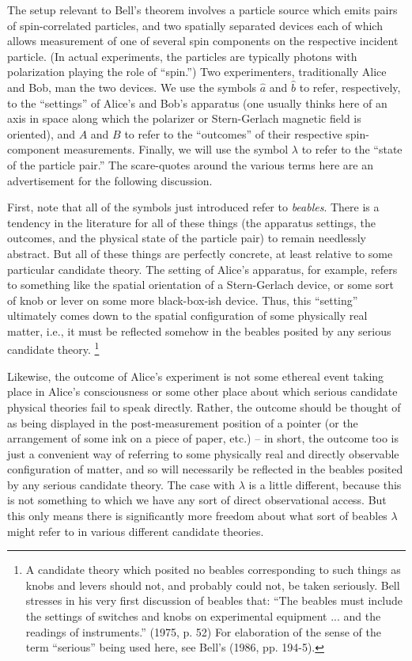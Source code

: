 \documentclass[aps,prc,twocolumn]{revtex4}
\begin{document}
The setup relevant to Bell's theorem involves a particle source which
emits pairs of spin-correlated particles, and two spatially separated
devices each of which allows measurement of one of several spin
components on the respective incident particle.  (In actual
experiments, the particles are typically photons with polarization
playing the role of ``spin.'')  Two experimenters, traditionally
Alice and Bob, man the two devices.  We use the symbols
$\hat{a}$ and $\hat{b}$ to refer, respectively, to the ``settings'' of
Alice's and Bob's apparatus (one usually thinks here of an axis in
space along which the polarizer or Stern-Gerlach magnetic field is
oriented), and $A$ and $B$ to refer to the
``outcomes'' of their respective spin-component measurements.
Finally, we will use the symbol $\lambda$ to refer to the ``state of
the particle pair.''  The scare-quotes around the various terms here
are an advertisement for the following discussion.

First, note that all of the symbols just introduced refer to
\emph{beables}.  There is a tendency in the literature for all of
these things (the apparatus settings, the outcomes, and the physical
state of the particle pair) to remain needlessly abstract.  But all of
these things are perfectly concrete, at least relative to some
particular candidate theory.  The setting of Alice's
apparatus, for example, refers to something like the spatial
orientation of a Stern-Gerlach device, or some sort of knob or lever
on some more black-box-ish device.  Thus, this ``setting'' ultimately
comes down to the spatial configuration of some physically real
matter, i.e., it must be reflected somehow in the beables posited by
any serious candidate theory. 
\footnote{A candidate theory which posited no
beables corresponding to such things as knobs and levers should not,
and probably could not, be taken seriously.  Bell stresses in his very
first discussion of beables that:  ``The beables must include the
settings of switches and knobs on experimental equipment ... and the
readings of instruments.'' (1975, p. 52)  For elaboration of
the sense of the term ``serious'' being used here, see Bell's (1986,
pp. 194-5).}

Likewise, the outcome of
Alice's experiment is not some ethereal event taking place in Alice's
consciousness or some other place about which serious candidate physical
theories fail to speak directly.  Rather, the outcome should be
thought of as being displayed in the post-measurement position of a
pointer (or the arrangement of some ink on a piece of paper, etc.) -- in
short, the outcome too is just a convenient way of referring to some
physically real and directly observable configuration of matter, and
so will necessarily be reflected in the beables posited by any serious
candidate theory.  The case with $\lambda$ is a little different,
because this is not something to which we have any sort of direct 
observational access.  But this only means there is significantly more
freedom about what sort of beables $\lambda$ might refer to in various
different candidate theories. 
\end{document}
